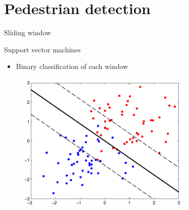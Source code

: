 \documentclass[14pt,t]{beamer}
\begin{document}
\section{Pedestrian detection}
%
\begin{frame}{Sliding window}
\begin{figure}
\centering
\end{figure}
\end{frame}
%
\begin{frame}{Support vector machines}
\begin{itemize}
\item Binary classification of each window
\end{itemize}
\begin{figure}
	\includegraphics[width=0.75\textwidth]{img/svmExample.pdf}
\end{figure}
\end{frame}
%
\end{document}
